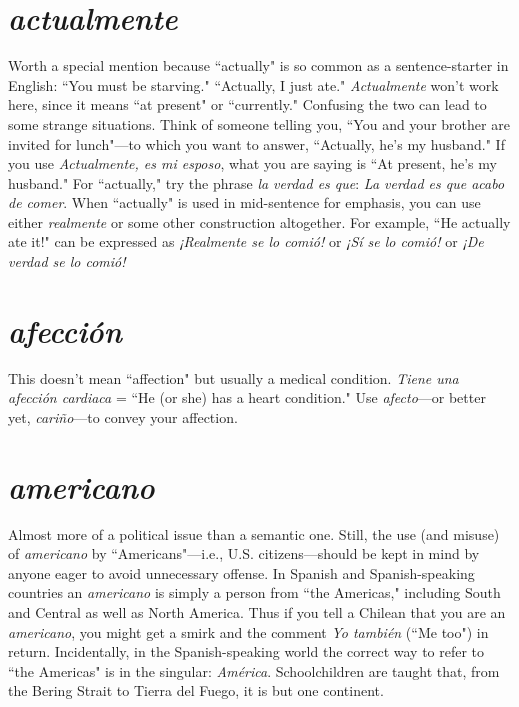 \section{\emph{actualmente}}

Worth a special mention because ``actually"
is so common as a sentence-starter in English: ``You must be starving."
``Actually, I just ate." \emph{Actualmente} won't work here, since it means
``at present" or ``currently." Confusing the two can lead to some
strange situations. Think of someone telling you, ``You and your
brother are invited for lunch"---to which you want to answer, ``Actually, he's my husband." If you use \emph{Actualmente, es mi esposo}, what
you are saying is ``At present, he's my husband." For ``actually," try the
phrase \emph{la verdad es que}: \emph{La verdad es que acabo de comer}. When ``actually" is used in mid-sentence for emphasis, you can use either
\emph{realmente} or some other construction altogether. For example, ``He actually ate it!" can be expressed as \emph{¡Realmente se lo comió!} or \emph{¡Sí se lo
comió!} or \emph{¡De verdad se lo comió!}

\section{\emph{afección}}

This doesn't mean ``affection" but usually a
medical condition. \emph{Tiene una afección cardiaca} = ``He (or she) has a
heart condition." Use \emph{afecto}---or better yet, \emph{cariño}---to convey your
affection.

\section{\emph{americano}}

Almost more of a political issue than a semantic one. Still, the use (and misuse) of \emph{americano} by ``Americans"---i.e.,
U.S. citizens---should be kept in mind by anyone eager to avoid unnecessary offense. In Spanish and Spanish-speaking countries an \emph{americano} is simply a person from ``the Americas," including South and
Central as well as North America. Thus if you tell a Chilean that you
are an \emph{americano}, you might get a smirk and the comment \emph{Yo también} (``Me too") in return. Incidentally, in the Spanish-speaking world
the correct way to refer to ``the Americas" is in the singular: \emph{América}.
Schoolchildren are taught that, from the Bering Strait to Tierra del
Fuego, it is but one continent.

